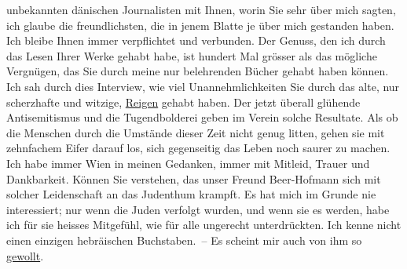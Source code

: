 \begin{ledgroupsized}[t]{13cm}
               unbekannten { }dänischen Journalisten mit
               Ihnen, worin Sie sehr \label{K_L02373-1v}\label{K_L02373-1h} über mich
               sagten, ich glaube die freundlichsten, die in jenem Blatte je über mich gestanden
               haben.\pend
           \pstart
           Ich bleibe Ihnen immer verpflichtet und {\pb}verbunden. Der Genuss, den ich
               durch das Lesen Ihrer Werke gehabt habe, ist hundert Mal grösser als das mögliche
               Vergnügen, das Sie durch meine nur belehrenden Bücher gehabt haben können.\pend
           \pstart
           Ich sah durch dies Interview, wie
               viel Unannehmlichkeiten Sie durch das alte, nur scherzhafte und witzige, \uline{Reigen} gehabt haben. Der jetzt überall glühende Antisemitismus und die Tugendbolderei
                  \introOben{}geben\introOben{} im Verein 
               solche Resultate. Als ob die Menschen durch die Umstände dieser Zeit nicht genug
               litten, gehen sie mit zehnfachem Eifer darauf los, sich gegenseitig das Leben noch
               saurer zu machen.\pend
           \pstart
           Ich habe immer Wien in meinen Gedanken, immer mit
               Mitleid, Trauer und Dankbarkeit. Können Sie verstehen, das unser Freund Beer-Hofmann sich {\pb}mit solcher Leidenschaft an das
               Judenthum krampft. Es hat mich im Grunde nie interessiert; nur wenn die Juden
               verfolgt wurden, und wenn sie es werden, habe ich für sie heisses Mitgefühl, wie für
               alle ungerecht unterdrückten. Ich kenne nicht einen einzigen hebräischen
               Buchstaben. – Es scheint mir auch von ihm so \uline{gewollt}.\pend
           \pstart

\end{ledgroupsized}

